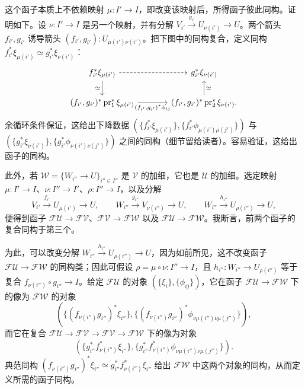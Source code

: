 这个函子本质上不依赖映射 $\mu\colon I'\to I$，即改变该映射后，所得函子彼此同构。证明如下。设 $\nu\colon I'\to I$ 是另一个映射，并有分解 $V_{i'}\xrightarrow{g_{i'}}U_{\nu(i')}\to U$。两个箭头 $f_{i'},g_{i'}$ 诱导箭头 $(f_{i'},g_{i'})\colon U_{\mu(i')\nu(i')}$。把下图中的同构复合，定义同构 $f_{i'}^*\xi_{\mu(i')}\simeq g_{i'}^*\xi_{\nu(i')}$：
\[
\begin{tikzcd}[column sep=large]
 f_{i'}^*\xi_{\mu(i')}\arrow[r,dashed]\arrow[d,"{\simeq}"'] &g_{i'}^*\xi_{\nu(i')}\\
 (f_{i'},g_{i'})^*\operatorname{pr}_1^*\xi_{\mu(i')}
 \arrow[r,"{(f_{i'},g_{i'})^*\phi_{ij}}"'] &(f_{i'},g_{i'})^*\operatorname{pr}_2^*\xi_{\nu(i')}\arrow[u,"{\simeq}"'].
\end{tikzcd}
\]
余循环条件保证，这给出下降数据
$(\{f_{i'}^*\xi_{\mu(i')}\},\{f_{i'}^*\phi_{\mu(i')\mu(j')}\})$ 与
$(\{g_{i'}^*\xi_{\nu(i')}\},\{g_{i'}^*\phi_{\nu(i')\nu(j')}\})$ 之间的同构（细节留给读者）。容易验证，这给出函子的同构。

此外，若 $\mathcal W=\{W_{i''}\to U\}_{i''\in I''}$ 是 $\mathcal V$ 的加细，它也是 $\mathcal U$ 的加细。选定映射 $\mu\colon I'\to I$、$\nu\colon I''\to I'$、$\rho\colon I''\to I$，以及分解
\[
 V_{i'}\xrightarrow{f_{i'}}U_{\mu(i')}\to U,\qquad
 W_{i''}\xrightarrow{g_{i''}}V_{\nu(i'')}\to U,\qquad
 W_{i''}\xrightarrow{h_{i''}}U_{\rho(i'')}\to U,
\]
便得到函子 $\mathcal F\mathcal U\to\mathcal F\mathcal V$、$\mathcal F\mathcal V\to\mathcal F\mathcal W$ 以及 $\mathcal F\mathcal U\to\mathcal F\mathcal W$。我断言，前两个函子的复合同构于第三个。

为此，可以改变分解 $W_{i''}\xrightarrow{h_{i''}}U_{\rho(i'')}\to U$，因为如前所见，这不改变函子 $\mathcal F\mathcal U\to\mathcal F\mathcal W$ 的同构类；因此可假设 $\rho=\mu\circ\nu\colon I''\to I$，且 $h_{i''}\colon W_{i''}\to U_{\rho(i'')}$ 等于复合 $f_{\nu(i'')}\circ g_{i''}\to I$。给定 $\mathcal F\mathcal U$ 的对象 $(\{\xi_i\},\{\phi_{ij}\})$，它在函子 $\mathcal F\mathcal U\to\mathcal F\mathcal W$ 下的像为 $\mathcal F\mathcal W$ 的对象
\[
 (\{(f_{\nu(i'')}g_{i''})^*\xi_{i''}\},
 \{(f_{\nu(i'')}g_{i''})^*\phi_{\nu\mu(i'')\nu\mu(j'')}\}),
\]
而它在复合 $\mathcal F\mathcal U\to\mathcal F\mathcal V\to\mathcal F\mathcal V\to\mathcal F\mathcal W$ 下的像为对象
\[
 (\{g_{i''}^*f_{\nu(i'')}^*\xi_{i''}\},
 \{g_{i''}^*f_{\nu(i'')}^*\phi_{\nu\mu(i'')\nu\mu(j'')}\}).
\]
典范同构 $(f_{\nu(i'')}g_{i''})^*\xi_{i''}\simeq g_{i''}^*f_{\nu(i'')}^*\xi_{i''}$ 给出 $\mathcal F\mathcal W$ 中这两个对象的同构，从而定义所需的函子同构。

